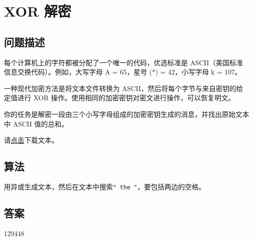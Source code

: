 \section{XOR 解密}
\subsection{问题描述}
\begin{tcolorbox}

	每个计算机上的字符都被分配了一个唯一的代码，优选标准是 ASCII（美国标准信息交换代码）。例如，大写字母 A = 65，星号 (*) = 42，小写字母 k = 107。

	一种现代加密方法是将文本文件转换为 ASCII，然后将每个字节与来自密钥的给定值进行 XOR 操作。使用相同的加密密钥对密文进行操作，可以恢复明文。

	你的任务是解密一段由三个小写字母组成的加密密钥生成的消息，并找出原始文本中 ASCII 值的总和。

	请\href{https://projecteuler.net/resources/documents/0059_cipher.txt}{点击}下载文本。
\end{tcolorbox}

\subsection{算法}
用异或生成文本，然后在文本中搜索\texttt{" the "}，要包括两边的空格。

\subsection{答案}
129448
